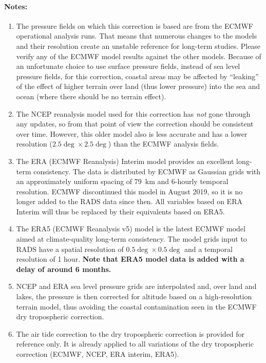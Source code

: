 \documentclass[a4paper,11pt,openany,natbib,nomargin]{thesis}
\newenvironment{notes}[1][Notes:]{\FloatBarrier\paragraph{#1}\begin{enumerate}}{\end{enumerate}}
\begin{document}
\begin{notes}
\item The pressure fields on which this correction is based are from the ECMWF operational analysis runs. That means that numerous changes to the models and their resolution create an unstable reference for long-term studies. Please verify any of the ECMWF model results against the other models. Because of an unfortunate choice to use surface pressure fields, instead of sea level pressure fields, for this correction, coastal areas may be affected by ``leaking'' of the effect of higher terrain over land (thus lower pressure) into the sea and ocean (where there should be no terrain effect).\label{item:dry_tropo_ecmwf}
\item The NCEP reanalysis model used for this correction has \emph{not} gone through any updates, so from that point of view the correction should be consistent over time. However, this older model also is less accurate and has a lower resolution ($2.5\deg\times2.5\deg$) than the ECMWF analysis fields. \label{item:dry_tropo_ncep}
\item The ERA (ECMWF Reanalysis) Interim model provides an excellent long-term consistency. The data is distributed by ECMWF as Gaussian grids with an approximately uniform spacing of 79~km and 6-hourly temporal resolution\citep{berrisford2011}. ECMWF discontinued this model in August 2019, so it is no longer added to the RADS data since then. All variables based on ERA Interim will thus be replaced by their equivalents based on ERA5.\label{item:dry_tropo_era}
\item The ERA5 (ECMWF Reanalysis v5) model is the latest ECMWF model aimed at climate-quality long-term consistency. The model grids input to RADS have a spatial resolution of $0.5\deg\times 0.5\deg$ and a temporal resolution of 1 hour. \textbf{Note that ERA5 model data is added with a delay of around 6 months.}\label{item:dry_tropo_era5}
\item NCEP and ERA sea level pressure grids are interpolated and, over land and lakes, the pressure is then corrected for altitude based on a high-resolution terrain model, thus avoiding the coastal contamination seen in the ECMWF dry tropospheric correction.\label{item:dry_tropo_lakes}
\item The air tide correction to the dry tropospheric correction is provided for reference only. It is already applied to all variations of the dry tropospheric correction (ECMWF, NCEP, ERA interim, ERA5).\label{item:dry_tropo_airtide}
\end{notes}
\end{document}
